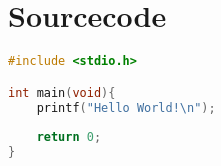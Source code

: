
\chapter{Sourcecode}
	\begin{lstlisting}[language=C, caption={Ein Beispielhafter Quellcode}]
#include <stdio.h>

int main(void){
	printf("Hello World!\n");
	
	return 0;
}
	\end{lstlisting}
